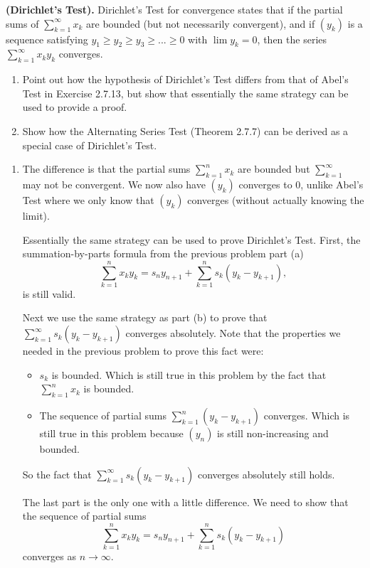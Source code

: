 \documentclass{oxmathproblems}
\begin{document}
\begin{questions}
\miquestion \textbf{(Dirichlet's Test).} Dirichlet's Test for convergence states that if the partial sums of $\sum_{k=1}^{\infty}x_{k}$ are bounded (but not necessarily convergent),
and if $(y_{k})$ is a sequence satisfying $y_{1} \geq y_{2} \geq y_{3} \geq ... \geq 0$ with $\lim y_{k}=0$, then the series $\sum_{k=1}^{\infty}x_{k}y_{k}$ converges.
\begin{enumerate}[label=(\alph*)]
  \item Point out how the hypothesis of Dirichlet's Test differs from that of Abel's Test in Exercise 2.7.13, but show that essentially the same strategy can be used to provide a proof.
  \item Show how the Alternating Series Test (Theorem 2.7.7) can be derived as a special case of Dirichlet's Test.
\end{enumerate}

\begin{solution}
  \begin{enumerate}[label=(\alph*)]
    \item The difference is that the partial sums $\sum_{k=1}^{n} x_{k}$ are bounded but $\sum_{k=1}^{\infty}$ may not be convergent. We now also have $(y_{k})$ converges to 0, unlike Abel's Test
    where we only know that $(y_{k})$ converges (without actually knowing the limit).

    Essentially the same strategy can be used to prove Dirichlet's Test. First, the summation-by-parts formula from the previous problem part (a)
    \[\sum_{k=1}^{n}x_{k}y_{k} = s_{n}y_{n+1} + \sum_{k=1}^{n}s_{k}(y_{k}-y_{k+1}),\]
    is still valid.

    Next we use the same strategy as part (b) to prove that $\sum_{k=1}^{\infty}s_{k}(y_{k}-y_{k+1})$ converges absolutely.
    Note that the properties we needed in the previous problem to prove this fact were:
    \begin{itemize}
      \item $s_{k}$ is bounded. Which is still true in this problem by the fact that $\sum_{k=1}^{n}x_{k}$ is bounded.
      \item The sequence of partial sums $\sum_{k=1}^{n}(y_{k}-y_{k+1})$ converges. Which is still true in this problem because $(y_{n})$ is still non-increasing and bounded.
    \end{itemize}
    So the fact that $\sum_{k=1}^{\infty}s_{k}(y_{k}-y_{k+1})$ converges absolutely still holds.

    The last part is the only one with a little difference. We need to show that the sequence of partial sums
    \[\sum_{k=1}^{n}x_{k}y_{k} = s_{n}y_{n+1} + \sum_{k=1}^{n}s_{k}(y_{k}-y_{k+1})\]
    converges as $n \rightarrow \infty$.


\end{enumerate}
\end{solution}
\end{questions}
\end{document}
